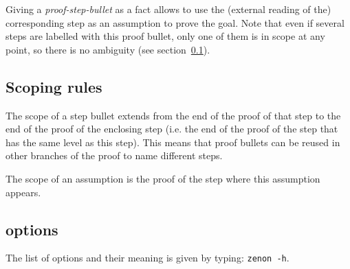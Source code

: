 Giving a {\em proof-step-bullet} as a fact allows {\zenon} to use the
(external reading of the) corresponding step as an assumption to prove the
goal. Note that even if several steps are labelled with this proof bullet,
only one of them is in scope at any point, so there is no ambiguity (see
section~\ref{sec:scoping}).

\subsection{Scoping rules}\label{sec:scoping}

The scope of a step bullet extends from the end of the proof of that
step to the end of the proof of the enclosing step (i.e. the end of
the proof of the  step that has the same level as this
step). This means that proof bullets can be reused in other branches
of the proof to name different steps.

The scope of an assumption is the proof of the step where this
assumption appears.

\subsection{{\zenon} options}
\label{zenon-options}
The list of {\zenon} options and their meaning is given by typing:
{\tt zenon -h}.
